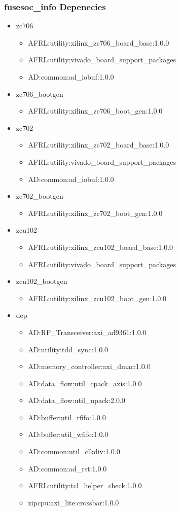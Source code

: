 \subsubsection{fusesoc\_info Depenecies}
\begin{itemize}
\item zc706
	\begin{itemize}
	\item AFRL:utility:xilinx\_zc706\_board\_base:1.0.0
	\item AFRL:utility:vivado\_board\_support\_packages
	\item AD:common:ad\_iobuf:1.0.0
	\end{itemize}
\item zc706\_bootgen
	\begin{itemize}
	\item AFRL:utility:xilinx\_zc706\_boot\_gen:1.0.0
	\end{itemize}
\item zc702
	\begin{itemize}
	\item AFRL:utility:xilinx\_zc702\_board\_base:1.0.0
	\item AFRL:utility:vivado\_board\_support\_packages
	\item AD:common:ad\_iobuf:1.0.0
	\end{itemize}
\item zc702\_bootgen
	\begin{itemize}
	\item AFRL:utility:xilinx\_zc702\_boot\_gen:1.0.0
	\end{itemize}
\item zcu102
	\begin{itemize}
	\item AFRL:utility:xilinx\_zcu102\_board\_base:1.0.0
	\item AFRL:utility:vivado\_board\_support\_packages
	\end{itemize}
\item zcu102\_bootgen
	\begin{itemize}
	\item AFRL:utility:xilinx\_zcu102\_boot\_gen:1.0.0
	\end{itemize}
\item dep
	\begin{itemize}
	\item AD:RF\_Transceiver:axi\_ad9361:1.0.0
	\item AD:utility:tdd\_sync:1.0.0
	\item AD:memory\_controller:axi\_dmac:1.0.0
	\item AD:data\_flow:util\_cpack\_axis:1.0.0
	\item AD:data\_flow:util\_upack:2.0.0
	\item AD:buffer:util\_rfifo:1.0.0
	\item AD:buffer:util\_wfifo:1.0.0
	\item AD:common:util\_clkdiv:1.0.0
	\item AD:common:ad\_rst:1.0.0
	\item AFRL:utility:tcl\_helper\_check:1.0.0
	\item zipcpu:axi\_lite:crossbar:1.0.0
	\end{itemize}
\end{itemize}
